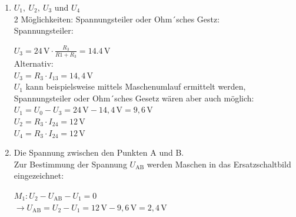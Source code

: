 {\begin{enumerate}[label=\alph*)]
        2. Möglichkeit, die hier, aber nicht immer anwendbar ist: Ohm´sches Gesetz:\\

        $I_{13} = \frac{U_0}{R1+R_3} = \frac{24 \, \mathrm{V}}{10 \, \mathrm{k} \Omega} = 2,4 \, \mathrm{mA}$\\

        $I_{24} = \frac{U_0}{R2+R_4} = \frac{24 \, \mathrm{V}}{40 \, \mathrm{k} \Omega} = 0,6 \, \mathrm{mA}$\\





        \item $U_1,\ U_2, \ U_3$ und $U_4$\\
        
        2 Möglichkeiten: Spannungsteiler oder Ohm´sches Gestz:\\
        
        Spannungsteiler:
        \begin{center}
        
        \end{center}
        $U_3 = 24 \, \mathrm{V} \cdot \frac{R_3}{R1+R_3} = 14.4 \, \mathrm{V}$\\
        Alternativ: \\
        $U_3 = R_3 \cdot I_{13} = 14,4 \, \mathrm{V}$\\

        $U_1$ kann beispielsweise mittels Maschenumlauf ermittelt werden, Spannungsteiler oder Ohm´sches Gesetz wären aber auch möglich:\\
        $U_1 = U_0 - U_3 = 24 \, \mathrm{V} - 14,4 \, \mathrm{V} = 9,6 \, \mathrm{V}$\\

        $U_2 = R_3 \cdot I_{24} = 12 \, \mathrm{V}$\\
        $U_4 = R_3 \cdot I_{24} = 12 \, \mathrm{V}$\\






        

        \item Die Spannung zwischen den Punkten A und B.\\
        
        Zur Bestimmung der Spannung $U_\mathrm{AB}$ werden Maschen in das Ersatzschaltbild eingezeichnet:
        \begin{center}
        
        \end{center}
        $M_1: U_2 - U_\mathrm{AB} - U_ 1 = 0$\\
        $\rightarrow  U_\mathrm{AB} = U_2 - U_1 = 12 \, \mathrm{V} - 9,6 \, \mathrm{V} = 2,4 \, \mathrm{V}$\\


\end{enumerate}}
